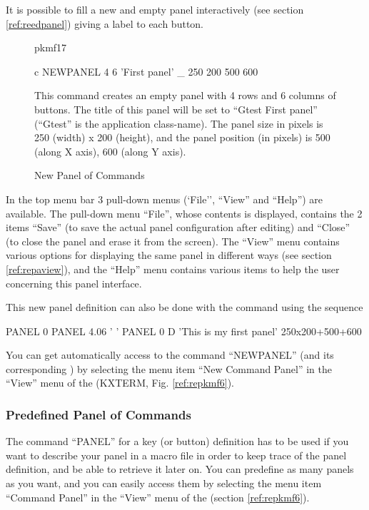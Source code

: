 It is possible to fill a new and empty panel interactively (see
section \ref{ref:reedpanel}) giving a label to each button.
 
\begin{figure}[tb]
\begin{PICTf}[.45]{pkmf17}
\hfill
\begin{Gray}{c}
NEWPANEL 4 6 'First panel' _
         250 200 500 600
\end{Gray}
This \KUIPMotif{} command creates an empty panel
with 4 rows and 6 columns of buttons. The title of
this panel will be set to ``Gtest First panel'' (``Gtest''
is the application class-name). The panel
size in pixels is 250 (width) x 200 (height), and the panel position
(in pixels) is 500 (along X axis), 600 (along Y axis).
\end{PICTf}
\caption{New Panel of Commands}
\label{ref:FIGPKMF17}
\end{figure}
 
In the top menu bar 3 pull-down menus (`File'', ``View'' and ``Help'')
are available. The pull-down menu ``File'', whose contents is displayed,
contains the 2 items ``Save'' (to save the actual panel configuration
after editing)
and ``Close'' (to close the panel and erase it from the screen).
The ``View'' menu contains various options for displaying the same panel
in different ways (see section \ref{ref:repaview}), and the ``Help''
menu contains various items to help the user concerning this panel interface.
 
This new panel definition can also be done with the command
 using the sequence
\begin{XMP}
   PANEL 0
   PANEL 4.06 ' '
   PANEL 0 D 'This is my first panel' 250x200+500+600
\vspace{-1cm}
\end{XMP}
 
You can get automatically access to the command ``NEWPANEL''
(and its corresponding \CAP{}) by selecting the menu item
``New Command Panel'' in the ``View'' menu of the \EW{}
(KXTERM, Fig. \ref{ref:repkmf6}).
 
\subsubsection{Predefined Panel of Commands}

The command ``PANEL'' for a key (or button) definition
has to be used if you want to describe your panel in a \KUIP{} macro file in
order to keep trace of the panel definition, and be able to retrieve it
later on. You can predefine as many panels as you want, and you can
easily access them by selecting the menu item ``Command Panel'' in the
``View'' menu of the \EW{} (section \ref{ref:repkmf6}).
 
